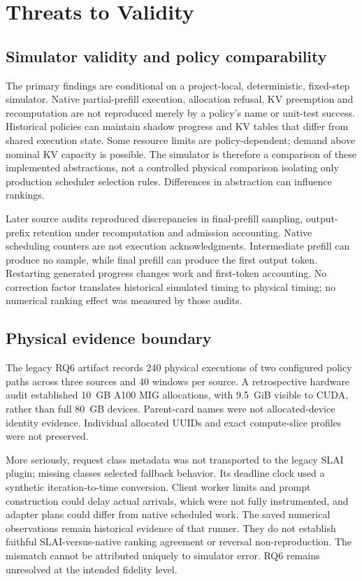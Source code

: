\section{Threats to Validity}\label{sec:threats}
\subsection{Simulator validity and policy comparability}
The primary findings are conditional on a project-local, deterministic,
fixed-step simulator. Native partial-prefill execution, allocation refusal,
KV preemption and recomputation are not reproduced merely by a policy's
name or unit-test success. Historical policies can maintain shadow progress
and KV tables that differ from shared execution state. Some resource limits
are policy-dependent; demand above nominal KV capacity is possible. The
simulator is therefore a comparison of these implemented abstractions,
not a controlled physical comparison isolating only production scheduler
selection rules. Differences in abstraction can influence rankings.

Later source audits reproduced discrepancies in final-prefill sampling,
output-prefix retention under recomputation and admission accounting.
Native scheduling counters are not execution acknowledgments. Intermediate
prefill can produce no sample, while final prefill can produce the first
output token. Restarting generated progress changes work and first-token
accounting. No correction factor translates historical simulated timing
to physical timing; no numerical ranking effect was measured by those audits.

\subsection{Physical evidence boundary}\label{sec:real-system}\label{sec:real-system-objective}\label{sec:real-system-design}\label{sec:real-system-result}
The legacy RQ6 artifact records 240 physical executions of two configured
policy paths across three sources and 40 windows per source. A retrospective
hardware audit established 10~GB A100 MIG allocations, with 9.5~GiB visible
to CUDA, rather than full 80~GB devices. Parent-card names were not
allocated-device identity evidence. Individual allocated UUIDs and exact
compute-slice profiles were not preserved.

More seriously, request class metadata was not transported to the legacy
SLAI plugin; missing classes selected fallback behavior. Its deadline clock
used a synthetic iteration-to-time conversion. Client worker limits and
prompt construction could delay actual arrivals, which were not fully
instrumented, and adapter plans could differ from native scheduled work.
The saved numerical observations remain historical evidence of that runner.
They do not establish faithful SLAI-versus-native ranking agreement or
reversal non-reproduction. The mismatch cannot be attributed uniquely to
simulator error. RQ6 remains unresolved at the intended fidelity level.

